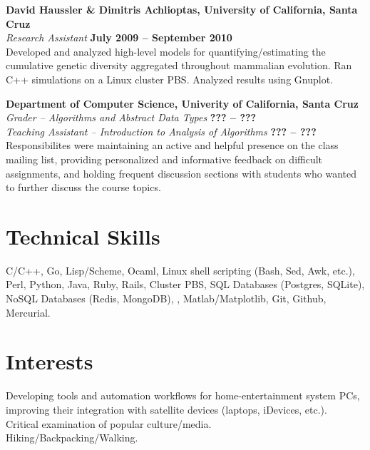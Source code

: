 \documentclass[margin,line]{resume}
\begin{document}
\begin{resume}
    \textbf{David Haussler \& Dimitris Achlioptas, University of California, Santa Cruz} \vspace{2mm}\\\vspace{1mm}%
    \textsl{Research Assistant} \hfill \textbf{July 2009 -- September 2010}\\
    Developed and analyzed high-level models for quantifying/estimating
    the cumulative genetic diversity aggregated throughout mammalian
    evolution. Ran C++ simulations on a Linux cluster PBS. Analyzed
    results using Gnuplot.

    \textbf{Department of Computer Science, Univerity of California, Santa Cruz} \vspace{2mm}\\\vspace{1mm}%
    \textsl{Grader -- Algorithms and Abstract Data Types} \hfill \textbf{??? -- ???}\\

    \textsl{Teaching Assistant -- Introduction to Analysis of Algorithms} \hfill \textbf{??? -- ???}\\
    Responsibilites were maintaining an active and helpful presence
    on the class mailing list, providing personalized and informative
    feedback on difficult assignments, and holding frequent discussion
    sections with students who wanted to further discuss the course
    topics.

    \section{\mysidestyle Technical Skills} 

    C/C++, Go, Lisp/Scheme, Ocaml,
    Linux shell scripting (Bash, Sed, Awk, etc.),
    Perl, Python, Java, Ruby, Rails, Cluster PBS,
    SQL Databases (Postgres, SQLite),
    NoSQL Databases (Redis, MongoDB),
    \LaTeXe, Matlab/Matplotlib, Git, Github,
    Mercurial.

    \section{\mysidestyle Interests} 

    Developing tools and automation workflows for home-entertainment system PCs, improving their integration with satellite devices (laptops, iDevices, etc.). \vspace{1mm}\\%
    Critical examination of popular culture/media. \vspace{1mm}\\%
    Hiking/Backpacking/Walking. \vspace{1mm}\\%


\end{resume}
\end{document}
